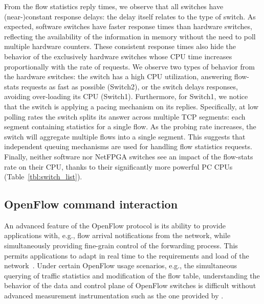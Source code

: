 From the flow statistics reply times, we observe that all switches have (near-)constant 
response delays: the delay itself relates to the type of switch.
As expected, software switches have faster response times than
hardware switches, reflecting the availability of the information in memory
without the need to poll multiple hardware counters. These consistent response
times also hide the behavior of the exclusively hardware switches
whose CPU time increases proportionally with the rate of requests.  We
observe two types of behavior from the hardware switches: the switch
has a high CPU utilization, answering flow-stats requests as fast as
possible (Switch2), or the switch delays responses, avoiding
over-loading its CPU (Switch1). Furthermore, for Switch1,
we notice that the switch is applying a pacing mechanism on its
replies. Specifically, at low polling rates the switch splits its
answer across multiple TCP segments: each segment containing statistics for a
single flow.  As the probing rate increases, the switch
will aggregate multiple flows into a single segment. This suggests that 
independent queuing mechanisms are used for handling flow statistics 
requests. Finally, neither software nor NetFPGA switches see an 
impact of the flow-stats rate on their CPU, thanks to their significantly 
more powerful PC CPUs (Table~\ref{tbl:switch_list}).

\subsection{OpenFlow command interaction}\label{sec:results-interactions}


An advanced feature of the OpenFlow protocol is its ability to
provide applications with, e.g., flow arrival notifications from the 
network, while simultaneously providing fine-grain control of 
the forwarding process. This permits applications to adapt
in real time to the requirements and load of the
network~\cite{plug_n_serv,Yap09}. Under certain OpenFlow usage
scenarios, e.g., the simultaneous querying of traffic statistics and
modification of the flow table, understanding the behavior of the data
and control plane of OpenFlow switches is difficult without advanced
measurement instrumentation such as the one provided by \oflops. 

